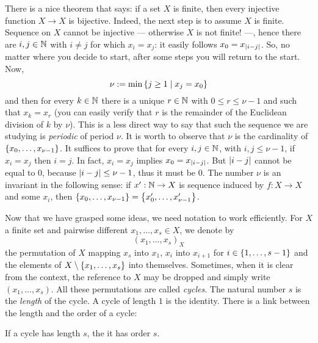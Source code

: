 There is a nice theorem that says: if a set \(X\) is finite, then every injective function \(X \to X\) is bijective. Indeed, the next step is to assume \(X\) is finite. Sequence on \(X\) cannot be injective --- otherwise \(X\) is not finite! ---, hence there are \(i, j \in \mathbb N\) with \(i \ne j\) for which \(x_i = x_j\): it easily follows \(x_0 = x_{\left\lvert i-j\right\rvert}\). So, no matter where you decide to start, after some steps you will return to the start. Now,
\[\nu := \min\left\{j \ge 1 \mid x_j = x_0\right\}\]
and then for every \(k \in \mathbb N\) there is a unique \(r \in \mathbb N\) with \(0 \le r \le \nu-1\) and such that \(x_k = x_r\) (you can easily verify that \(r\) is the remainder of the Euclidean division of \(k\) by \(\nu\)). This is a less direct way to say that such the sequence we are studying is {\em periodic} of period \(\nu\). It is worth to observe that \(\nu\) is the cardinality of \(\left\{x_0, \dots{}, x_{\nu-1}\right\}\). It suffices to prove that for every \(i, j \in \mathbb N\), with \(i, j \le \nu-1\), if \(x_i = x_j\) then \(i = j\). In fact, \(x_i = x_j\) implies \(x_0 = x_{\left\lvert i-j\right\rvert}\). But \(\left\lvert i-j\right\rvert\) cannot be equal to \(0\), because \(\left\lvert i-j\right\rvert \le \nu-1\), thus it must be \(0\). The number \(\nu\) is an invariant in the following sense: if \(x' : \mathbb N \to X\) is sequence induced by \(f : X \to X\) and some \(x_i\), then \(\left\{x_0, \dots{}, x_{\nu-1}\right\} = \left\{x'_0, \dots{}, x'_{\nu-1}\right\}\).

Now that we have grasped some ideas, we need notation to work efficiently. For \(X\) a finite set and pairwise different \(x_1, \dots{}, x_s \in X\), we denote by
\[\left( x_1, \dots{}, x_s \right)_X\]
the permutation of \(X\) mapping \(x_s\) into \(x_1\), \(x_i\) into \(x_{i+1}\) for \(i \in \left\{1, \dots{}, s-1\right\}\) and the elements of \(X \setminus \left\{x_1, \dots{}, x_s\right\}\) into themselves. Sometimes, when it is clear from the context, the reference to \(X\) may be dropped and simply write \(\left( x_1, \dots{}, x_s \right)\). All these permutations are called {\em cycles}. The natural number \(s\) is the {\em length} of the cycle. A cycle of length \(1\) is the identity. There is a link between the length and the order of a cycle:

\begin{proposition}
If a cycle has length \(s\), the it has order \(s\).
\end{proposition}


